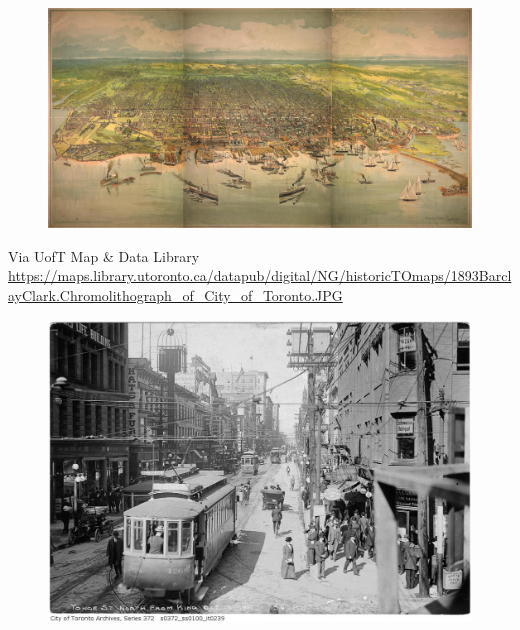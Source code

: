 \documentclass[aspectratio=169]{beamer}
\begin{document}
\begin{frame}
	
	\begin{figure}
		\centering
		\includegraphics[width=1.1\linewidth]{images/toronto_1893.jpg}
		
	\end{figure}
	\tiny{Via UofT Map \& Data Library \url{https://maps.library.utoronto.ca/datapub/digital/NG/historicTOmaps/1893BarclayClark.Chromolithograph_of_City_of_Toronto.JPG}}
	
\end{frame}










\begin{frame}
	
	\begin{figure}
		\centering
		\includegraphics[width=0.8\linewidth]{images/yonge-north-from-king-1911.jpg}
		
	\end{figure}

	
\end{frame}
\end{document}
